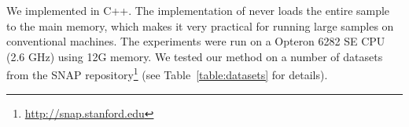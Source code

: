 \begin{table}[ht]
\centering
{}
\caption{\scriptsize The datasets, corresponding statistics, and the rate of generating new items at each step.}\label{table:datasets}
\end{table}

 We implemented \algonameapx in C++. The implementation of \algonameapx never loads the entire sample
to the main memory, which makes it very practical for running large samples on
conventional machines. The experiments were run on a Opteron 6282 SE CPU (2.6
GHz) using 12G memory. We tested our method on a number of datasets from the
SNAP repository\footnote{\url{http://snap.stanford.edu}} (see
Table~\ref{table:datasets} for details).

